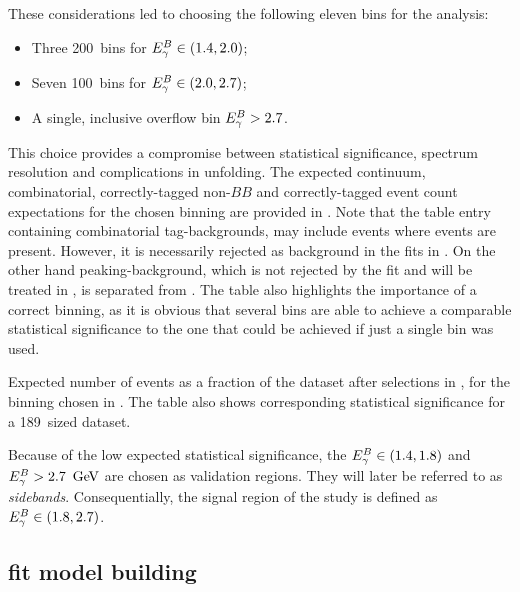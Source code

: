 These considerations led to choosing the following eleven \EB bins for the analysis:
\begin{itemize}
    \item Three 200~\mev bins for ${E^B_{\gamma}}\in(1.4,2.0)$;
    \item Seven 100~\mev bins for ${E^B_{\gamma}}\in(2.0,2.7)$;
    \item A single, inclusive overflow bin ${E^B_{\gamma}}>2.7$.
\end{itemize}
This choice provides a compromise between statistical significance, \EB spectrum resolution and complications in unfolding.
The expected continuum, combinatorial, correctly-tagged non-\BtoXsgamma $BB$ and correctly-tagged \BtoXsgamma event count expectations for the chosen binning are provided in .
Note that the table entry containing combinatorial tag-\B backgrounds, may include events where \BtoXsgamma events are present.
However, it is  necessarily rejected as background in the \Mbc fits in .
On the other hand peaking-\BB background, which is not rejected by the \Mbc fit and will be treated in , is separated from \BtoXsgamma.
The table also highlights the importance of a correct binning, as it is obvious that several bins are able to achieve a comparable statistical significance to the one that could be achieved if just a single bin was used.

\begin{table}[htbp!]
    \caption{\label{tab:expected_events}Expected number of events as a fraction of the dataset after selections in , for the binning chosen in .
    The table also shows corresponding statistical significance for a 189~\invfb sized dataset.
    }
    
\end{table}

Because of the low expected statistical significance, the ${E^B_{\gamma}}\in(1.4,1.8)$ and ${E^B_{\gamma}}>2.7~\mathrm{\,Ge\kern -0.1em V}$ are chosen as validation regions.
They will later be referred to as \textit{sidebands}.
Consequentially, the signal region of the study is defined as ${E^B_{\gamma}}\in(1.8,2.7)$.

\subsection{\texorpdfstring{\Mbc}{Mbc} fit model building}\label{sec:fitting_setup}


